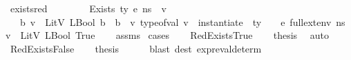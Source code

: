 \begin{isabellebody}
\isanewline
%
\endisadelimproof
\isanewline
{}\isamarkupfalse%
\ exists{\isacharunderscore}{\kern0pt}red{\isacharcolon}{\kern0pt}\isanewline
\ \ \ {\isachardoublequoteopen}\ {\isasymLambda}{\isacharcomma}{\kern0pt}\ {\isasymGamma}{\isacharcomma}{\kern0pt}\ {\isasymOmega}\ {\isasymturnstile}\ {\isasymlangle}Exists\ ty\ e{\isacharcomma}{\kern0pt}\ n{\isacharunderscore}{\kern0pt}s{\isasymrangle}\ {\isasymDown}\ v{\isachardoublequoteclose}\isanewline
\ \ \ {\isachardoublequoteopen}{\isasymexists}b{\isachardot}{\kern0pt}\ {\isacharparenleft}{\kern0pt}v\ {\isacharequal}{\kern0pt}\ LitV\ {\isacharparenleft}{\kern0pt}LBool\ b{\isacharparenright}{\kern0pt}{\isacharparenright}{\kern0pt}\ {\isasymand}\ {\isacharparenleft}{\kern0pt}b\ {\isacharequal}{\kern0pt}\ {\isacharparenleft}{\kern0pt}{\isasymexists}v{\isacharprime}{\kern0pt}{\isachardot}{\kern0pt}\ {\isacharparenleft}{\kern0pt}type{\isacharunderscore}{\kern0pt}of{\isacharunderscore}{\kern0pt}val\ v{\isacharprime}{\kern0pt}\ {\isacharequal}{\kern0pt}\ {\isacharparenleft}{\kern0pt}instantiate\ {\isasymOmega}\ ty{\isacharparenright}{\kern0pt}{\isacharparenright}{\kern0pt}\ {\isasymand}\ {\isasymLambda}{\isacharcomma}{\kern0pt}{\isasymGamma}{\isacharcomma}{\kern0pt}{\isasymOmega}\ {\isasymturnstile}\ {\isasymlangle}e{\isacharcomma}{\kern0pt}\ full{\isacharunderscore}{\kern0pt}ext{\isacharunderscore}{\kern0pt}env\ n{\isacharunderscore}{\kern0pt}s\ v{\isacharprime}{\kern0pt}{\isasymrangle}\ {\isasymDown}\ LitV\ {\isacharparenleft}{\kern0pt}LBool\ True{\isacharparenright}{\kern0pt}{\isacharparenright}{\kern0pt}{\isacharparenright}{\kern0pt}{\isachardoublequoteclose}\isanewline
%
\isadelimproof
\ \ %
\endisadelimproof
%
\isatagproof
{}\isamarkupfalse%
\ assms\isanewline
{}\isamarkupfalse%
\ {\isacharparenleft}{\kern0pt}cases{\isacharparenright}{\kern0pt}\isanewline
\ \ \isamarkupfalse%
\ RedExistsTrue\isanewline
\ \ \isamarkupfalse%
\ {\isacharquery}{\kern0pt}thesis\ \isamarkupfalse%
\ auto\isanewline
{}\isamarkupfalse%
\isanewline
\ \ \isamarkupfalse%
\ {\isacharparenleft}{\kern0pt}RedExistsFalse{\isacharparenright}{\kern0pt}\isanewline
\ \ \isamarkupfalse%
\ {\isacharquery}{\kern0pt}thesis\ \isanewline
\ \ \ \isamarkupfalse%
\ {\isacharparenleft}{\kern0pt}blast\ dest{\isacharcolon}{\kern0pt}\ expr{\isacharunderscore}{\kern0pt}eval{\isacharunderscore}{\kern0pt}determ{\isacharparenleft}{\kern0pt}{}{\isacharparenright}{\kern0pt}{\isacharparenright}{\kern0pt}\isanewline

\end{isabellebody}
